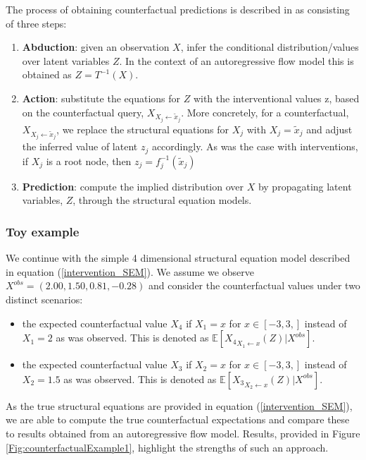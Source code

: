 \documentclass[]{article}
\begin{document}
The process of obtaining counterfactual predictions is described in 
\cite{pearl2009causal} as consisting of three steps:
\begin{enumerate}
	\item \textbf{Abduction}: given an observation $X$, infer the conditional distribution/values over 
	latent variables $Z$. 
	In the context of an autoregressive flow model this is obtained as $Z= T^{-1} ( X )$. 
	\item \textbf{Action}: substitute
	the equations for $Z$ with the interventional values z, 
	based on the counterfactual query, $X_{X_j \leftarrow \tilde x_j}$.
	More concretely, for a counterfactual, $X_{X_j \leftarrow \tilde x_j}$, we 
	replace the 
	structural equations for $X_j$ with 
	$X_j = \tilde x_j$ and 
	adjust the inferred value of latent $z_j$ accordingly. 
	As was the case with interventions, 
	if $X_j$ is a root node, then $z_j = f_j^{-1}( \tilde x_j)$
	
	\item \textbf{Prediction}:  compute the implied distribution over $X$ by propagating latent variables, $Z$, 
	through the structural equation models. 
\end{enumerate}



\subsubsection*{Toy example}
We continue with the simple 4 dimensional structural equation model
described in equation (\ref{intervention_SEM}). 
We assume we observe $X^{obs} = (2.00  ,  1.50 ,  0.81, -0.28)$
and consider the counterfactual 
values under two distinct scenarios:
\begin{itemize}
	\item  the expected counterfactual value $X_4$ if $X_1=x$ for $x \in [-3,3,]$ instead of
	$X_1=2$ as was observed. This is denoted as $\mathbb{E}[{X_4}_{X_1\leftarrow x}(Z) | X^{obs} ]$.
	\item the expected counterfactual value $X_3$ if $X_2=x$ for $x \in [-3,3,]$ instead of
	$X_2=1.5$ as was observed. This is denoted as $\mathbb{E}[{X_3}_{X_2\leftarrow x}(Z) | X^{obs} ]$.
\end{itemize}
%
As the true structural equations are provided in equation (\ref{intervention_SEM}), we are able to
compute the true counterfactual expectations and compare these to 
results obtained from an autoregressive flow model. Results, provided in Figure \ref{Fig:counterfactualExample1}, 
highlight the strengths of such an approach.  
\end{document}
